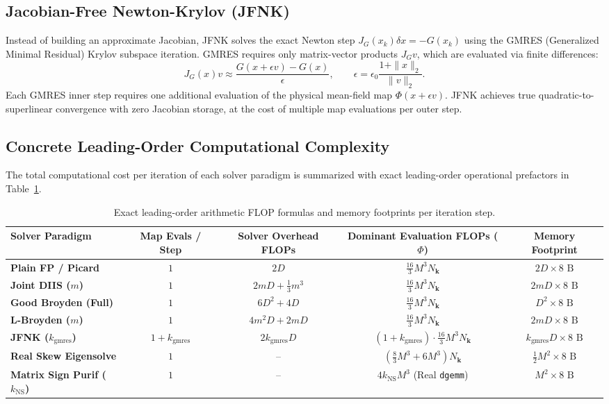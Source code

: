 \subsection{Jacobian-Free Newton-Krylov (JFNK)}
Instead of building an approximate Jacobian, JFNK solves the exact Newton step $J_G(x_k) \delta x = -G(x_k)$ using the GMRES (Generalized Minimal Residual) Krylov subspace iteration. GMRES requires only matrix-vector products $J_G v$, which are evaluated via finite differences:
\begin{equation}
J_G(x) v \approx \frac{G(x + \epsilon v) - G(x)}{\epsilon}, \qquad \epsilon = \epsilon_0 \frac{1 + \|x\|_2}{\|v\|_2}.
\end{equation}
Each GMRES inner step requires one additional evaluation of the physical mean-field map $\Phi(x + \epsilon v)$. JFNK achieves true quadratic-to-superlinear convergence with zero Jacobian storage, at the cost of multiple map evaluations per outer step.

\subsection{Concrete Leading-Order Computational Complexity}
The total computational cost per iteration of each solver paradigm is summarized with exact leading-order operational prefactors in Table~\ref{tab:m1_6_solver_leading_order_flops}.

\begin{table}[t]
\centering
\small
\caption{Exact leading-order arithmetic FLOP formulas and memory footprints per iteration step.}
\label{tab:m1_6_solver_leading_order_flops}
\begin{tabular}{lcccc}
\toprule
\textbf{Solver Paradigm} & \textbf{Map Evals / Step} & \textbf{Solver Overhead FLOPs} & \textbf{Dominant Evaluation FLOPs ($\Phi$)} & \textbf{Memory Footprint} \\
\midrule
\textbf{Plain FP / Picard} & $1$ & $2D$ & $\frac{16}{3} M^3 N_{\mathbf{k}}$ & $2 D \times 8\text{ B}$ \\
\textbf{Joint DIIS ($m$)} & $1$ & $2mD + \frac{1}{3}m^3$ & $\frac{16}{3} M^3 N_{\mathbf{k}}$ & $2m D \times 8\text{ B}$ \\
\textbf{Good Broyden (Full)} & $1$ & $6D^2 + 4D$ & $\frac{16}{3} M^3 N_{\mathbf{k}}$ & $D^2 \times 8\text{ B}$ \\
\textbf{L-Broyden ($m$)} & $1$ & $4m^2 D + 2mD$ & $\frac{16}{3} M^3 N_{\mathbf{k}}$ & $2m D \times 8\text{ B}$ \\
\textbf{JFNK ($k_{\mathrm{gmres}}$)} & $1 + k_{\mathrm{gmres}}$ & $2 k_{\mathrm{gmres}} D$ & $(1 + k_{\mathrm{gmres}}) \cdot \frac{16}{3} M^3 N_{\mathbf{k}}$ & $k_{\mathrm{gmres}} D \times 8\text{ B}$ \\
\midrule
\textbf{Real Skew Eigensolve} & $1$ & -- & $\left(\frac{8}{3} M^3 + 6 M^3\right) N_{\mathbf{k}}$ & $\frac{1}{2} M^2 \times 8\text{ B}$ \\
\textbf{Matrix Sign Purif ($k_{\mathrm{NS}}$)} & $1$ & -- & $4 k_{\mathrm{NS}} M^3$ (Real \texttt{dgemm}) & $M^2 \times 8\text{ B}$ \\
\bottomrule
\end{tabular}
\end{table}

